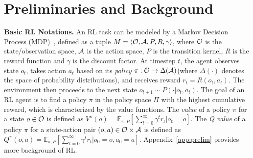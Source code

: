 \vspace{-1em}
\section{Preliminaries and Background}
\label{sec:prelim}

\textbf{Basic RL Notations.}
An RL task can be modeled by a Markov Decision Process (MDP)~\citep{puterman2014markov}, defined as a tuple $M=\langle \mathcal{O},\mathcal{A},P,R,\gamma \rangle$, where $\mathcal{O}$ is the state/observation space, $\mathcal{A}$ is the action space, $P$ is the transition kernel, $R$ is the reward function and $\gamma$ is the discount factor. 
At timestep $t$, the agent observes state $o_t$, takes action $a_t$ based on its \textit{policy} $\pi: \mathcal{O} \to \Delta(\mathcal{A})$(where $\Delta(\cdot)$ denotes the space of probability distributions), and receives reward $r_t=R(o_t,a_t)$. The environment then proceeds to the next state $o_{t+1} \sim P(\cdot|o_t, a_t)$.
The goal of an RL agent is to find a policy $\pi$ in the policy space $\Pi$ with the highest cumulative reward, which is characterized by the value functions.
The \textit{value} of a policy $\pi$ for a state $o\in\mathcal{O}$ is defined as $V^\pi(o) = \mathbb{E}_{\pi,P}[\sum_{t=0}^\infty \gamma^t r_t|o_{0}=o]$. The \textit{Q value} of a policy $\pi$ for a state-action pair $(o,a) \in \mathcal{O} \times \mathcal{A}$ is defined as $Q^\pi(o,a) = \mathbb{E}_{\pi,P}[\sum_{t=0}^\infty \gamma^t r_t|o_0=o, a_0=a]$. Appendix~\ref{app:prelim} provides more background of RL.


